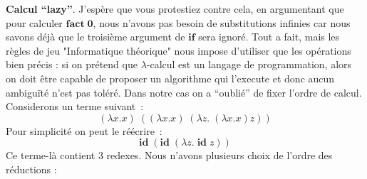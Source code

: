 \documentclass[12pt, a4paper]{article}
\newcommand{\id}{\mathbf{id}}
\begin{document}
\textbf{Calcul ``lazy''}. J'espère que vous protestiez contre cela, en argumentant que pour calculer $\mathbf{fact\;0}$, nous n'avons pas besoin de substitutions infinies car nous savons déjà que le troisième argument de $\mathbf{if}$ sera ignoré.
Tout a fait, mais les règles de jeu "Informatique théorique" nous impose d'utiliser que les opérations bien précis : si on prétend que $\lambda$-calcul est un langage de programmation, alors on doit être capable de proposer un algorithme qui l'execute et donc aucun ambiguïté n'est pas toléré.
Dans notre cas on a ``oublié'' de fixer l'ordre de calcul.
Considerons un terme suivant~:
$$(\lambda x.x) \; ((\lambda x.x) \; (\lambda z. \; (\lambda x.x) z))$$
Pour simplicité on peut le réécrire~:
$$\id \; (\id \; (\lambda z. \; \id \; z))$$
Ce terme-là contient 3 redexes. Nous n'avons plusieurs choix de l'ordre des réductions :
\end{document}
